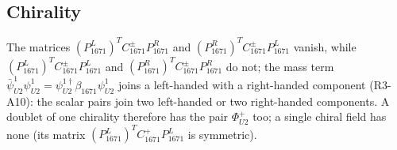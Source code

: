 \subsection{Chirality}

The matrices $(P^L_{1671})^TC^\pm_{1671}P^R_{1671}$ and $(P^R_{1671})^TC^\pm_{1671}P^L_{1671}$ vanish,
while $(P^L_{1671})^TC^\pm_{1671}P^L_{1671}$ and $(P^R_{1671})^TC^\pm_{1671}P^R_{1671}$ do not; the
mass term $\bar\psi^1_{U2}\psi^1_{U2}=\psi^{1\dagger}_{U2}\beta_{1671}\psi^1_{U2}$ joins a left-handed with a right-handed component
(R3-A10): the scalar pairs join two left-handed or two right-handed components. A doublet of one
chirality therefore has the pair $\Phi^+_{U2}$ too; a single chiral field has none (its matrix
$(P^L_{1671})^TC^+_{1671}P^L_{1671}$ is symmetric).
